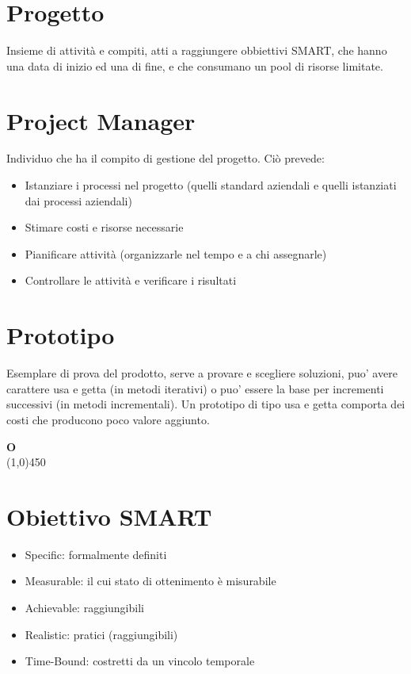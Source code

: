 	\section{Progetto}
	\label{sec:progetto}
	Insieme di attività e compiti, atti a raggiungere obbiettivi SMART, che hanno una data di inizio ed una di fine, e che consumano un pool di risorse limitate.	
	
	\section{Project Manager}
	\label{sec:projectmanager}
	Individuo che ha il compito di gestione del progetto. Ciò prevede:
	\begin{itemize}  
	\item Istanziare i processi nel progetto (quelli standard aziendali e quelli istanziati dai processi aziendali)
	\item Stimare costi e risorse necessarie
	\item Pianificare attività (organizzarle nel tempo e a chi assegnarle)
	\item Controllare le attività e verificare i risultati
	\end{itemize}	
		
	\section{Prototipo}
	\label{sec:prototipo}
	Esemplare di prova del prodotto, serve a provare e scegliere soluzioni, puo' avere carattere usa e getta (in metodi iterativi) 
	o puo' essere la base per incrementi successivi (in metodi incrementali).
	Un prototipo di tipo usa e getta comporta dei costi che producono poco valore aggiunto.\newpage	

	{\Huge{\textbf{O}}} \\
	\line(1,0){450}
		
	\section{Obiettivo SMART}
	\label{sec:smart}
	\begin{itemize}  
	\item Specific: formalmente definiti
	\item Measurable: il cui stato di ottenimento è misurabile
	\item Achievable: raggiungibili
	\item Realistic: pratici (raggiungibili)
	\item Time-Bound: costretti da un vincolo temporale
	\end{itemize}\newpage


